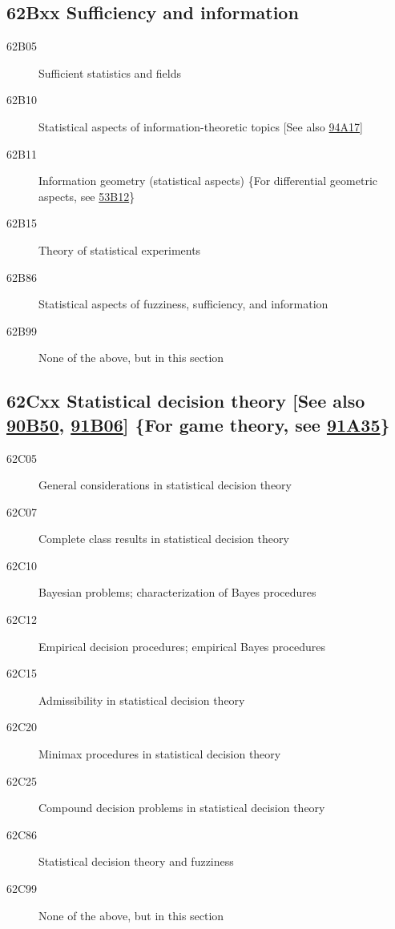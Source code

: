 \documentclass[letterpaper]{article}
\begin{document}
\subsection*{62Bxx  Sufficiency and information }\label{62Bxx}
\begin{description}  
\item [62B05]\label{62B05} Sufficient statistics and fields
\item [62B10]\label{62B10} Statistical aspects of information-theoretic topics  [See also \hyperref[94A17]{94A17}]
\item [62B11]\label{62B11} Information geometry (statistical aspects) \{For differential geometric aspects, see \hyperref[53B12]{53B12}\}
\item [62B15]\label{62B15} Theory of statistical experiments
\item [62B86]\label{62B86} Statistical aspects of fuzziness, sufficiency, and information
\item [62B99]\label{62B99} None of the above, but in this section
\end{description}
\subsection*{62Cxx  Statistical decision theory [See also \hyperref[90B50]{90B50}, \hyperref[91B06]{91B06}] \{For game theory, see \hyperref[91A35]{91A35}\} }\label{62Cxx}
\begin{description}  
\item [62C05]\label{62C05} General considerations in statistical decision theory
\item [62C07]\label{62C07} Complete class results in statistical decision theory
\item [62C10]\label{62C10} Bayesian problems; characterization of Bayes procedures
\item [62C12]\label{62C12} Empirical decision procedures; empirical Bayes procedures
\item [62C15]\label{62C15} Admissibility in statistical decision theory
\item [62C20]\label{62C20} Minimax procedures in statistical decision theory
\item [62C25]\label{62C25} Compound decision problems in statistical decision theory
\item [62C86]\label{62C86} Statistical decision theory and fuzziness
\item [62C99]\label{62C99} None of the above, but in this section
\end{description}
\end{document}
